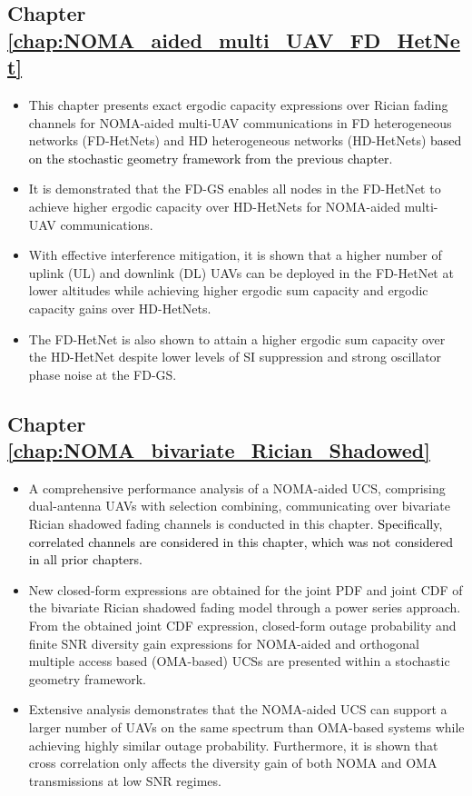 \subsection{Chapter \ref{chap:NOMA_aided_multi_UAV_FD_HetNet}}
\begin{itemize}
\item This chapter presents exact ergodic capacity expressions over Rician fading channels for NOMA-aided multi-UAV communications in FD heterogeneous networks (FD-HetNets) and HD heterogeneous networks (HD-HetNets) \textcolor{black}{based on the stochastic geometry framework from the previous chapter}.
\item It is demonstrated that the FD-GS enables all nodes in the FD-HetNet to achieve higher ergodic capacity over HD-HetNets for NOMA-aided multi-UAV communications.
\item With effective interference mitigation, it is shown that a higher number of uplink (UL) and downlink (DL) UAVs can be deployed in the FD-HetNet at lower altitudes while achieving higher ergodic sum capacity and ergodic capacity gains over HD-HetNets.
\item The FD-HetNet is also shown to attain a higher ergodic sum capacity over the HD-HetNet despite lower levels of SI suppression and strong oscillator phase noise at the FD-GS.
\end{itemize}

\subsection{Chapter \ref{chap:NOMA_bivariate_Rician_Shadowed}}
\begin{itemize}
\item A comprehensive performance analysis of a NOMA-aided UCS, comprising dual-antenna UAVs with selection combining, communicating over bivariate Rician shadowed fading channels is conducted in this chapter. \textcolor{black}{Specifically, correlated channels are considered in this chapter, which was not considered in all prior chapters.}
\item New closed-form expressions are obtained for the joint PDF and joint CDF of the bivariate Rician shadowed fading model through a power series approach. From the obtained joint CDF expression, closed-form outage probability and finite SNR diversity gain expressions for NOMA-aided and orthogonal multiple access based (OMA-based) UCSs are presented within a stochastic geometry framework.
\item Extensive analysis demonstrates that the NOMA-aided UCS can support a larger number of UAVs on the same spectrum than OMA-based systems while achieving highly similar outage probability. Furthermore, it is shown that cross correlation only affects the diversity gain of both NOMA and OMA transmissions at low SNR regimes. 
\end{itemize}
 
